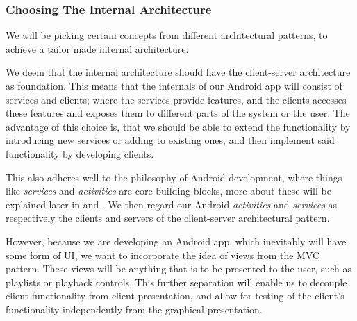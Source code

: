 \subsubsection{Choosing The Internal Architecture}
We will be picking certain concepts from different architectural patterns, to achieve a tailor made internal architecture.

We deem that the internal architecture should have the client-server architecture as foundation.
This means that the internals of our Android app will consist of services and clients;
where the services provide features, and the clients accesses these features and exposes them to different parts of the system or the user.
The advantage of this choice is, that we should be able to extend the functionality by introducing new services or adding to existing ones, and then implement said functionality by developing clients.

This also adheres well to the philosophy of Android development, where things like \textit{services} and \textit{activities} are core building blocks, more about these will be explained later in  and .
We then regard our Android \textit{activities} and \textit{services} as respectively the clients and servers of the client-server architectural pattern.

However, because we are developing an Android app, which inevitably will have some form of \ac{UI}, we want to incorporate the idea of views from the \ac{MVC} pattern.
These views will be anything that is to be presented to the user, such as playlists or playback controls.
This further separation will enable us to decouple client functionality from client presentation, and allow for testing of the client's functionality independently from the graphical presentation.

